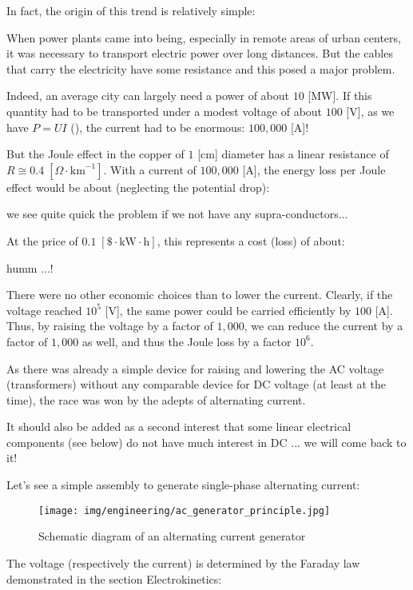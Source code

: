 	In fact, the origin of this trend is relatively simple:

	When power plants came into being, especially in remote areas of urban centers, it was necessary to transport electric power over long distances. But the cables that carry the electricity have some resistance and this posed a major problem.

	Indeed, an average city can largely need a power of about $10$ [MW]. If this quantity had to be transported under a modest voltage of about $100$ [V], as we have $P=UI$ (), the current had to be enormous: $100,000$ [A]!

	But the Joule effect in the copper of $1$ [cm] diameter has a linear resistance of $R\cong 0.4\;[\Omega\cdot \text{km}^{-1}]$. With a current of $100,000$ [A], the energy loss per Joule effect would be about (neglecting the potential drop):
	
	we see quite quick the problem if we not have any supra-conductors...

	At the price of $0.1 \;[\$\cdot\text{kW}\cdot \text{h}]$, this represents a cost (loss) of about:
	
	humm ...!
	
	There were no other economic choices than to lower the current. Clearly, if the voltage reached $10^5$ [V], the same power could be carried efficiently by $100$ [A]. Thus, by raising the voltage by a factor of $1,000$, we can reduce the current by a factor of $1,000$ as well, and thus the Joule loss by a factor $10^6$.

	As there was already a simple device for raising and lowering the AC voltage (transformers) without any comparable device for DC voltage (at least at the time), the race was won by the adepts of alternating current.

	It should also be added as a second interest that some linear electrical components (see below) do not have much interest in DC ... we will come back to it!

	Let's see a simple assembly to generate single-phase alternating current:
	\begin{figure}[H]
		\centering
		\texttt{[image: img/engineering/ac\_generator\_principle.jpg]}
		\caption{Schematic diagram of an alternating current generator}
	\end{figure}
	The voltage (respectively the current) is determined by the Faraday law demonstrated in the section Electrokinetics:
	
